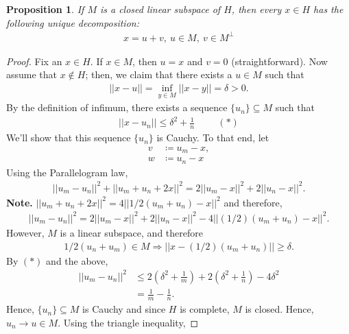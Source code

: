 \documentclass[psamsfonts]{amsart}
\newtheorem{prop}[thm]{Proposition}
\theoremstyle{definition}
\theoremstyle{remark}
\numberwithin{equation}{section}
\begin{document}
\begin{prop}
	If \( M \) is a closed linear subspace of \( H \), then every \( x \in H \) has the following unique decomposition: 
	\begin{align*}
		x = u+v,\ u \in M,\ v \in M^\perp 
	\end{align*}
\end{prop}
\begin{proof}
	Fix an \( x \in H \). If \( x \in M \), then \( u = x \) and \( v = 0 \) (straightforward). Now assume that \( x \notin H \); then, we claim that there exists a \( u \in M \) such that 
	\begin{align*}
		|| x -u || = \inf_{y \in M } ||x-y|| = \delta > 0.
	\end{align*}
	By the definition of infimum, there exists a sequence \( \{ u_n \} \subseteq M \) such that
	\begin{align*} 
		|| x - u_n || \leq \delta^2 + \frac{1}{n} \hspace{1cm} (*)
	\end{align*}
	We'll show that this sequence \( \{ u_n \} \) is Cauchy. To that end, let
	\begin{align*}
		v & \coloneqq u_m - x, \\
		w & \coloneqq u_n - x 
	\end{align*}
	Using the Parallelogram law, 
	\begin{align*}
		||u_m - u_n||^2 + ||u_m + u_n + 2x||^2 = 2||u_m - x||^2 + 2 ||u_n - x||^2 .
	\end{align*}
	\textbf{Note.} \( || u_m + u_n + 2x||^2 = 4 || 1/2 (u_m + u_n) - x ||^2 \)  and therefore, 
	\begin{align*}
		||u_m - u_n||^2 = 2 ||u_m - x ||^2 + 2||u_n - x||^2 - 4 || (1/2)(u_m + u_n)-x||^2.
	\end{align*}
	However, \( M \) is a linear subspace, and therefore
	\begin{align*}
		1/2(u_n + u_m) \in M \Rightarrow || x - (1/2)(u_m + u_n) || \geq \delta.
	\end{align*}
	By \( (*) \) and the above, 
	\begin{align*}
		||u_m - u_n||^2 & \leq 2 \left( \delta^2 + \frac{1}{m} \right) + 2 \left( \delta^2 + \frac{1}{n} \right) - 4 \delta^2 \\
		& = \frac{1}{m} - \frac{1}{n}.
	\end{align*}
	Hence, \( \{ u_n \} \subseteq M \) is Cauchy and since \( H \) is complete, \( M \) is closed. Hence, \( u_n \rightarrow u \in M \). Using the triangle inequality, 

\end{proof}
\end{document}
